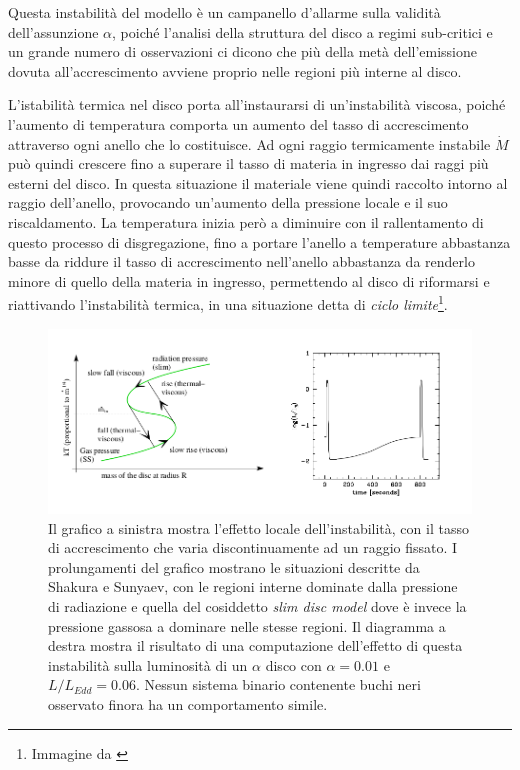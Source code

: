 \documentclass[a4paperbi]{article}
\begin{document}
	Questa instabilità del modello è un campanello d'allarme sulla validità dell'assunzione $\alpha$, poiché l'analisi della struttura del disco a regimi sub-critici e un grande numero di osservazioni ci dicono che più della metà dell'emissione dovuta all'accrescimento avviene proprio nelle regioni più interne al disco.
	
	L'istabilità termica nel disco porta all'instaurarsi di un'instabilità viscosa, poiché l'aumento di temperatura comporta un aumento del tasso di accrescimento attraverso ogni anello che lo costituisce. Ad ogni raggio termicamente instabile $\dot{M}$ può quindi crescere fino a superare il tasso di materia in ingresso dai raggi più esterni del disco. In questa situazione il materiale viene quindi raccolto intorno al raggio dell'anello, provocando un'aumento della pressione locale e il suo riscaldamento. La temperatura inizia però a diminuire con il rallentamento di questo processo di disgregazione, fino a portare l'anello a temperature abbastanza basse da riddure il tasso di accrescimento nell'anello abbastanza da renderlo minore di quello della materia in ingresso, permettendo al disco di riformarsi e riattivando l'instabilità termica, in una situazione detta di \textit{ciclo limite}\footnote{Immagine da \cite{DoneGierlinskiKubota2007}}.

	\begin{figure}[H]
		\centering
		\includegraphics[width=0.9\linewidth]{PresInstLimitCycle}
		\caption{Il grafico a sinistra mostra l'effetto locale dell'instabilità, con il tasso di accrescimento che varia discontinuamente ad un raggio fissato. I prolungamenti del grafico mostrano le situazioni descritte da Shakura e Sunyaev, con le regioni interne dominate dalla pressione di radiazione e quella del cosiddetto \textit{slim disc model} dove è invece la pressione gassosa a  dominare nelle stesse regioni. Il diagramma a destra mostra il risultato di una computazione dell'effetto di questa instabilità sulla luminosità di un $\alpha$ disco con $\alpha=0.01$ e $L/L_{Edd}=0.06$. Nessun sistema binario contenente buchi neri osservato finora ha un comportamento simile.}
		\label{fig:PresInstLimitCycle}
	\end{figure}
	
\end{document}
